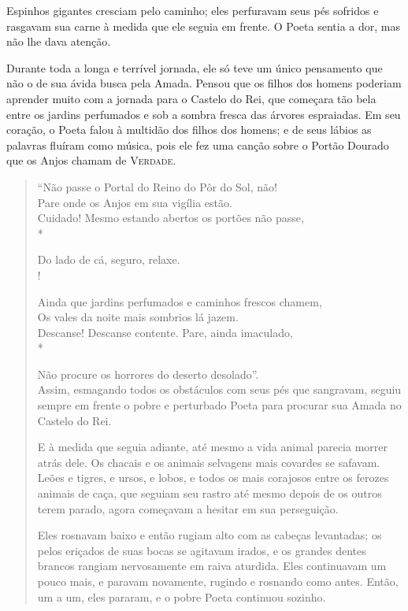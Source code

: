 Espinhos gigantes cresciam pelo caminho; eles perfuravam seus pés
sofridos e rasgavam sua carne à medida que ele seguia em frente. O Poeta
sentia a dor, mas não lhe dava atenção.

Durante toda a longa e terrível jornada, ele só teve um único pensamento
que não o de sua ávida busca pela Amada. Pensou que os filhos dos
homens poderiam aprender muito com a jornada para o Castelo do Rei, que
começara tão bela entre os jardins perfumados e sob a sombra fresca das
árvores espraiadas. Em seu coração, o Poeta falou à multidão dos filhos
dos homens; e de seus lábios as palavras fluíram como música, pois ele
fez uma canção sobre o Portão Dourado que os Anjos chamam de
\textsc{Verdade}.

\begin{verse}
``Não passe o Portal do Reino do Pôr do Sol, não!\\

Pare onde os Anjos em sua vigília estão.\\

Cuidado! Mesmo estando abertos os portões não passe,\\*

Do lado de cá, seguro, relaxe.\\!

Ainda que jardins perfumados e caminhos frescos chamem,\\

Os vales da noite mais sombrios lá jazem.\\

Descanse! Descanse contente. Pare, ainda imaculado,\\*

Não procure os horrores do deserto desolado''.\\

Assim, esmagando todos os obstáculos com seus pés que sangravam, seguiu
sempre em frente o pobre e perturbado Poeta para procurar sua Amada no
Castelo do Rei.

E à medida que seguia adiante, até mesmo a vida animal parecia morrer
atrás dele. Os chacais e os animais selvagens mais covardes se safavam.
Leões e tigres, e ursos, e lobos, e todos os mais corajosos entre os
ferozes animais de caça, que seguiam seu rastro até mesmo depois de os
outros terem parado, agora começavam a hesitar em sua perseguição.

Eles rosnavam baixo e então rugiam alto com as cabeças levantadas; os
pelos eriçados de suas bocas se agitavam irados, e os grandes dentes
brancos rangiam nervosamente em raiva aturdida. Eles continuavam
um pouco mais, e paravam novamente, rugindo e rosnando como antes.
Então, um a um, eles pararam, e o pobre Poeta continuou sozinho.


\end{verse}
